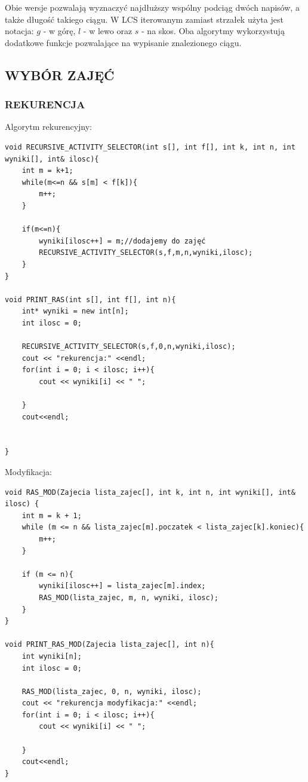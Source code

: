 \documentclass{article}
\begin{document}
Obie wersje pozwalają wyznaczyć najdłuższy wspólny podciąg dwóch napisów, a także długość takiego ciągu. W LCS iterowanym zamiast strzałek użyta jest notacja: $g$ - w górę, $l$ - w lewo oraz $s$ - na skos. Oba algorytmy wykorzystują dodatkowe funkcje pozwalające na wypisanie znalezionego ciągu.
\subsection*{WYBÓR ZAJĘĆ}
\subsubsection{REKURENCJA}
Algorytm rekurencyjny:
\begin{verbatim}
void RECURSIVE_ACTIVITY_SELECTOR(int s[], int f[], int k, int n, int wyniki[], int& ilosc){
    int m = k+1;
    while(m<=n && s[m] < f[k]){
        m++;
    }

    if(m<=n){
        wyniki[ilosc++] = m;//dodajemy do zajęć
        RECURSIVE_ACTIVITY_SELECTOR(s,f,m,n,wyniki,ilosc);
    }
}

void PRINT_RAS(int s[], int f[], int n){
    int* wyniki = new int[n];
    int ilosc = 0;

    RECURSIVE_ACTIVITY_SELECTOR(s,f,0,n,wyniki,ilosc);
    cout << "rekurencja:" <<endl;
    for(int i = 0; i < ilosc; i++){
        cout << wyniki[i] << " ";
        
    }
    cout<<endl;

    
}
\end{verbatim}
Modyfikacja:
\begin{verbatim}
void RAS_MOD(Zajecia lista_zajec[], int k, int n, int wyniki[], int& ilosc) {
    int m = k + 1;
    while (m <= n && lista_zajec[m].poczatek < lista_zajec[k].koniec){
        m++;
    }

    if (m <= n){
        wyniki[ilosc++] = lista_zajec[m].index; 
        RAS_MOD(lista_zajec, m, n, wyniki, ilosc); 
    }
}

void PRINT_RAS_MOD(Zajecia lista_zajec[], int n){
    int wyniki[n];
    int ilosc = 0;

    RAS_MOD(lista_zajec, 0, n, wyniki, ilosc);
    cout << "rekurencja modyfikacja:" <<endl;
    for(int i = 0; i < ilosc; i++){
        cout << wyniki[i] << " ";
        
    }
    cout<<endl;    
}
\end{verbatim}
\end{document}
